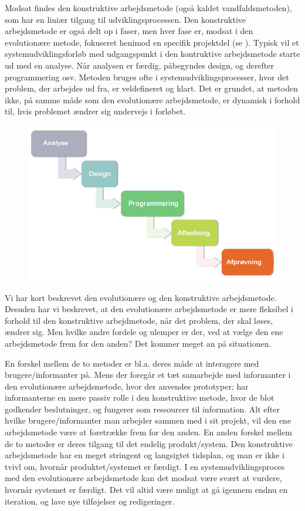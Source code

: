 Modsat findes den konstruktive arbejdsmetode (også kaldet vandfaldsmetoden), som har en liniær tilgang til udviklingsprocessen. Den konstruktive arbejdsmetode er også delt op i faser, men hver fase er, modsat i den evolutionære metode, fokuseret henimod en specifik projektdel (se ). Typisk vil et systemudviklingsforløb med udgangspunkt i den kontruktive arbejdsmetode starte ud med en analyse. Når analysen er færdig, påbegyndes design, og derefter programmering osv. Metoden bruges ofte i systemudviklingsprocesser, hvor det problem, der arbejdes ud fra, er veldefineret og klart. Det er grundet, at metoden ikke, på samme måde som den evolutionære arbejdsmetode, er dynamisk i forhold til, hvis problemet ændrer sig undervejs i forløbet.

\begin{figure}[ht]
	\centering
	\includegraphics[scale=0.5]{billeder/konstruktivemetode.png}
  	\label{fig:konstruktivemetode}
\end{figure}

Vi har kort beskrevet den evolutionære og den konstruktive arbejdsmetode. Desuden har vi beskrevet, at den evolutionære arbejdsmetode er mere fleksibel i forhold til den konstruktive arbejdmetode, når det problem, der skal løses, ændrer sig. Men hvilke andre fordele og ulemper er der, ved at vælge den ene arbejdsmetode frem for den anden? Det kommer meget an på situationen.

En forskel mellem de to metoder er bl.a. deres måde at interagere med brugere/informanter på. Mens der foregår et tæt samarbejde med informanter i den evolutionære arbejdsmetode, hvor der anvendes prototyper; har informanterne en mere passiv rolle i den konstruktive metode, hvor de blot godkender beslutninger, og fungerer som ressourcer til information. Alt efter hvilke brugere/informanter man arbejder sammen med i sit projekt, vil den ene arbejdsmetode være at foretrække frem for den anden. En anden forskel mellem de to metoder er deres tilgang til det endelig produkt/system. Den konstruktive arbejdsmetode har en meget stringent og langsigtet tidsplan, og man er ikke i tvivl om, hvornår produktet/systemet er færdigt. I en systemudviklingsproces med den evolutionære arbejdsmetode kan det modsat være svært at vurdere,  hvornår systemet er færdigt. Det vil altid være muligt at gå igennem endnu en iteration, og lave nye tilføjelser og redigeringer.

